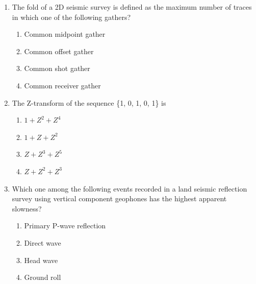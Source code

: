 \documentclass[journal,12pt,onecolumn]{IEEEtran}
\begin{document}
\begin{enumerate}
\hfill{}

\begin{multicols}{2}
\begin{enumerate}
\item crust -- mantle
\item mantle -- outer core
\item outer core -- inner core
\item upper mantle -- lower mantle
\end{enumerate}
\end{multicols}

\item The fold of a 2D seismic survey is defined as the maximum number of traces in which one of the following gathers?  

\hfill{}

\begin{multicols}{2}
\begin{enumerate}
\item Common midpoint gather
\item Common offset gather
\item Common shot gather
\item Common receiver gather
\end{enumerate}
\end{multicols}

\item The Z-transform of the sequence \{1, 0, 1, 0, 1\} is  

\hfill{}

\begin{multicols}{2}
\begin{enumerate}
\item $1 + Z^2 + Z^4$
\item $1 + Z + Z^2$
\item $Z + Z^3 + Z^5$
\item $Z + Z^2 + Z^3$
\end{enumerate}
\end{multicols}

\item Which one among the following events recorded in a land seismic reflection survey using vertical component geophones has the highest apparent slowness?  

\hfill{}

\begin{multicols}{2}
\begin{enumerate}
\item Primary P-wave reflection
\item Direct wave
\item Head wave
\item Ground roll
\end{enumerate}
\end{multicols}


\end{enumerate}
\end{document}
